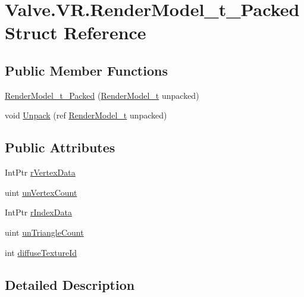\hypertarget{struct_valve_1_1_v_r_1_1_render_model__t___packed}{}\section{Valve.\+V\+R.\+Render\+Model\+\_\+t\+\_\+\+Packed Struct Reference}
\label{struct_valve_1_1_v_r_1_1_render_model__t___packed}
\subsection*{Public Member Functions}
\begin{DoxyCompactItemize}
\item 
\mbox{\hyperlink{struct_valve_1_1_v_r_1_1_render_model__t___packed_ae0022ba91aeab058e00680c5aa9be90f}{Render\+Model\+\_\+t\+\_\+\+Packed}} (\mbox{\hyperlink{struct_valve_1_1_v_r_1_1_render_model__t}{Render\+Model\+\_\+t}} unpacked)
\item 
void \mbox{\hyperlink{struct_valve_1_1_v_r_1_1_render_model__t___packed_a2a2f2e0c52d442e0b2647a91ae9ed0bc}{Unpack}} (ref \mbox{\hyperlink{struct_valve_1_1_v_r_1_1_render_model__t}{Render\+Model\+\_\+t}} unpacked)
\end{DoxyCompactItemize}
\subsection*{Public Attributes}
\begin{DoxyCompactItemize}
\item 
Int\+Ptr \mbox{\hyperlink{struct_valve_1_1_v_r_1_1_render_model__t___packed_a8fbab5a478a1ad222089a3396fac2970}{r\+Vertex\+Data}}
\item 
uint \mbox{\hyperlink{struct_valve_1_1_v_r_1_1_render_model__t___packed_a28ee2915f267296786ff490d73696d2c}{un\+Vertex\+Count}}
\item 
Int\+Ptr \mbox{\hyperlink{struct_valve_1_1_v_r_1_1_render_model__t___packed_aaab17990d446536f8751e590a5c8c642}{r\+Index\+Data}}
\item 
uint \mbox{\hyperlink{struct_valve_1_1_v_r_1_1_render_model__t___packed_a9729cbcd5c61320e7ad802b72d552c3d}{un\+Triangle\+Count}}
\item 
int \mbox{\hyperlink{struct_valve_1_1_v_r_1_1_render_model__t___packed_a64bb59932399b8ebe5ea81a050c98b90}{diffuse\+Texture\+Id}}
\end{DoxyCompactItemize}


\subsection{Detailed Description}


